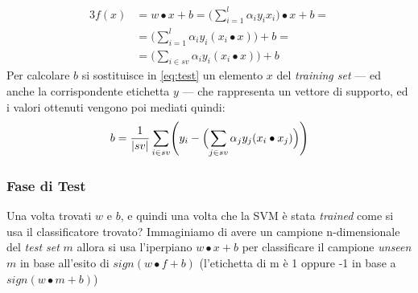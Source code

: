 \begin{alignat}{3}
f(x)&= w \bullet x +b = \Biggl(\sum_{i=1}^{l}\alpha_{i}y_{i}x_i\Biggl) \bullet x +b = \nonumber\\
&=\Biggl(\sum_{i=1}^{l}\alpha_{i}y_{i}(x_i \bullet x)\Biggl) +b =\nonumber\\
&= \Biggl(\sum_{i \in sv}^{}\alpha_{i}y_{i}(x_i \bullet x)\Biggl) +b \label{eq:test}
\end{alignat} 
Per calcolare $b$ si sostituisce in \ref{eq:test} un elemento $x$ del \textit{training set} --- ed anche la corrispondente etichetta $y$ --- che rappresenta un vettore di supporto, ed i valori ottenuti vengono poi mediati quindi:
\begin{equation}
\label{eq:bhard}
b = \frac{1}{\lvert sv\rvert} \sum_{i \in sv}^{}\Biggl(y_i - \Bigl(\sum_{j \in sv}^{}\alpha_{j}y_{j}(x_i \bullet x_j)\Bigl)\Biggl)
\end{equation}

\subsubsection{Fase di Test}
Una volta trovati $w$ e $b$, e quindi una volta che la \ac{SVM} è stata \textit{trained} come si usa il classificatore trovato? Immaginiamo di avere un campione n-dimensionale del \textit{test set} $m$ allora si usa l'iperpiano $w \bullet x +b$ per classificare il campione \emph{unseen} $m$ in base all'esito di $sign(w \bullet f + b)$ (l'etichetta di m è 1 oppure -1 in base a $sign(w \bullet m + b)$)

